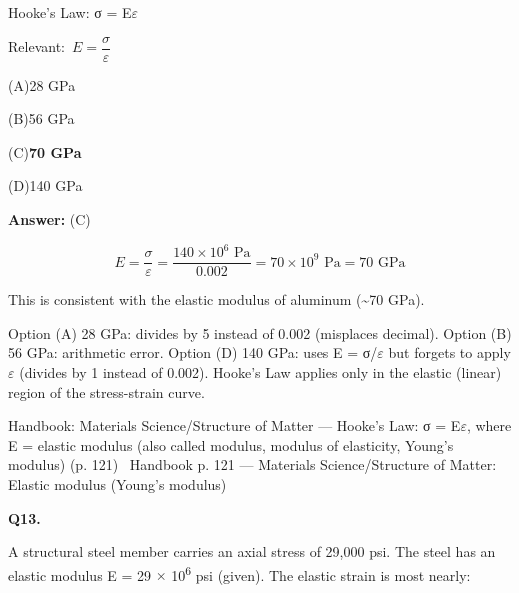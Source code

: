 \documentclass[11pt]{article}
\newcommand{\correct}[1]{\textbf{#1}\;{\color{accent}$\checkmark$}}
\newcommand{\optline}[2]{\par\noindent\hspace{1.2em}(#1)\hspace{0.6em}#2}
\begin{document}
Hooke's Law: σ = E$\varepsilon$\par\vspace{3pt}
{\small\color{soft}Relevant:}\ $E = \dfrac{\sigma}{\varepsilon}$\par\vspace{3pt}
\optline{A}{28 GPa}
\optline{B}{56 GPa}
\optline{C}{\correct{70 GPa}}
\optline{D}{140 GPa}
\par\vspace{3pt}
\vspace{2pt}\par\noindent\colorbox{boxbg}{\parbox{\dimexpr\linewidth-2\fboxsep\relax}{%
\vspace{2pt}\textbf{Answer:} (C)\par\vspace{2pt}
{\small \[E = \frac{\sigma}{\varepsilon} = \frac{140 \times 10^6\text{ Pa}}{0.002} = 70 \times 10^9\text{ Pa} = 70\text{ GPa}\]

This is consistent with the elastic modulus of aluminum (\textasciitilde{}70 GPa).

Option (A) 28 GPa: divides by 5 instead of 0.002 (misplaces decimal). Option (B) 56 GPa: arithmetic error. Option (D) 140 GPa: uses E = σ/$\varepsilon$ but forgets to apply $\varepsilon$ (divides by 1 instead of 0.002). Hooke's Law applies only in the elastic (linear) region of the stress-strain curve.}\par\vspace{2pt}
{\footnotesize\color{soft}Handbook: Materials Science/Structure of Matter --- Hooke's Law: σ = E$\varepsilon$, where E = elastic modulus (also called modulus, modulus of elasticity, Young's modulus) (p. 121) \textbullet\ Handbook p. 121 --- Materials Science/Structure of Matter: Elastic modulus (Young's modulus)}\vspace{2pt}
}}
\vspace{9pt}
\filbreak
\textbf{\color{accent}Q13.}\par\vspace{2pt}
A structural steel member carries an axial stress of 29,000 psi. The steel has an elastic modulus E = 29 $\times$ 10\textsuperscript{6} psi (given). The elastic strain is most nearly:
\end{document}
